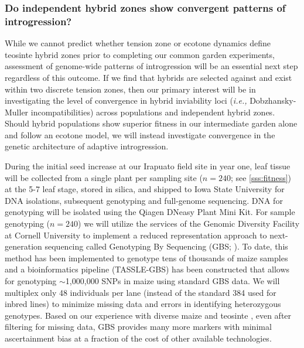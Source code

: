 \subsubsection{Do independent hybrid zones show convergent patterns of introgression?}
\label{sss:genomescan}

While we cannot predict whether tension zone or ecotone dynamics define teosinte hybrid zones prior to completing our common garden experiments, assessment of genome-wide patterns of introgression will be an essential next step regardless of this outcome.
If we find that hybrids are selected against and exist within two discrete tension zones, then our primary interest will be in investigating the level of convergence in hybrid inviability loci (\emph{i.e.,} Dobzhansky-Muller incompatibilities) across populations and independent hybrid zones.
Should hybrid populations show superior fitness in our intermediate garden alone and follow an ecotone model, we will instead investigate convergence in the genetic architecture of adaptive introgression.

During the initial seed increase at our Irapuato field site in year one, leaf tissue will be collected from a single plant per sampling site ($n=240$; see \ref{sss:fitness}) at the 5-7 leaf stage, stored in silica, and shipped to Iowa State University for DNA isolations, subsequent genotyping and full-genome sequencing.
DNA for genotyping will be isolated using the Qiagen DNeasy Plant Mini Kit.
For sample genotyping ($n=240$) we will utilize the services of the Genomic Diversity Facility at Cornell University to implement a reduced representation approach to next-generation sequencing called Genotyping By Sequencing (GBS; \citealt{Elshire2011}).
To date, this method has been implemented to genotype tens of thousands of maize samples and a bioinformatics pipeline (TASSLE-GBS) has been constructed that allows for genotyping $\sim$1,000,000 SNPs in maize \citep{Glaubitz2014} using standard GBS data. 
We will multiplex only 48 individuals per lane (instead of the standard 384 used for inbred lines) to minimize missing data and errors in identifying heterozygous genotypes. 
Based on our experience with diverse maize and teosinte \citep[\emph{e.g.,}][]{Takuno15062015, mezmouk2014pattern}, even after filtering for missing data, GBS provides many more markers with minimal ascertainment bias at a fraction of the cost of other available technologies. 

